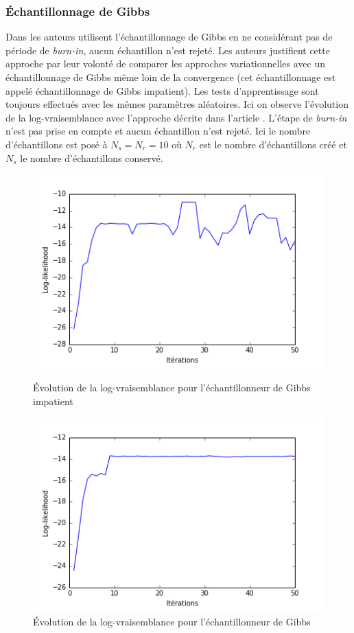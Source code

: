 \documentclass[10pt,a4paper]{article}
\begin{document}
\subsubsection{Échantillonnage de Gibbs}

Dans \cite{ghahramani1997factorial} les auteurs utilisent l'échantillonnage
de Gibbs en ne considérant pas de période de \textit{burn-in}, aucun
échantillon n'est rejeté.
Les auteurs justifient cette approche par leur volonté de comparer les
approches variationnelles avec un échantillonnage de Gibbs même loin de la
convergence (cet échantillonnage est appelé échantillonnage de Gibbs
impatient).
Les tests d'apprentissage sont toujours effectués avec les mêmes paramètres
aléatoires.
Ici on observe l'évolution de la log-vraisemblance avec l'approche décrite dans
l'article \cite{ghahramani1997factorial}.
L'étape de \textit{burn-in} n'est pas prise en compte et aucun échantillon
n'est rejeté.
Ici le nombre d'échantillons est posé à $N_s=N_r=10$ où $N_r$ est le nombre
d'échantillons créé et $N_s$ le nombre d'échantillons conservé.

\begin{figure}[H]
  \centering
  \begin{minipage}{.45\linewidth}
  \centering
  \includegraphics[scale=0.3]{../resources/pictures/M3_K2_gibbsnoburning.png}
  \caption{Évolution de la log-vraisemblance pour l'échantillonneur de Gibbs impatient}
  \end{minipage}
\centering
\begin{minipage}{.45\linewidth}
\centering
\includegraphics[scale=0.3]{../resources/pictures/M3_K2_gibbs.png}
\caption{Évolution de la log-vraisemblance pour l'échantillonneur de Gibbs}
\end{minipage}
\end{figure}
\end{document}
